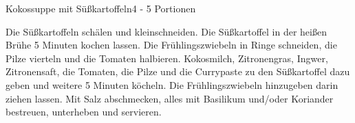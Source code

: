 \documentclass[a4paper,10pt]{article}
\begin{document}
    \begin{recipe}{Kokossuppe mit Süßkartoffeln}{4 - 5 Portionen}{}
        
        \freeform \hfill 
    
        Die Süßkartoffeln schälen und kleinschneiden. Die Süßkartoffel in der 
        heißen Brühe 5 Minuten kochen lassen.
        Die Frühlingszwiebeln in Ringe schneiden, die Pilze vierteln und die Tomaten halbieren.
        Kokosmilch, Zitronengras, Ingwer, Zitronensaft, die Tomaten, die Pilze und die Currypaste zu den
        Süßkartoffel dazu geben und weitere 5 Minuten köcheln. Die Frühlingszwiebeln hinzugeben darin 
        ziehen lassen.
        Mit Salz abschmecken, alles mit Basilikum und/oder Koriander bestreuen, unterheben und servieren.
    \end{recipe}
    
    \newpage
    
\end{document}
